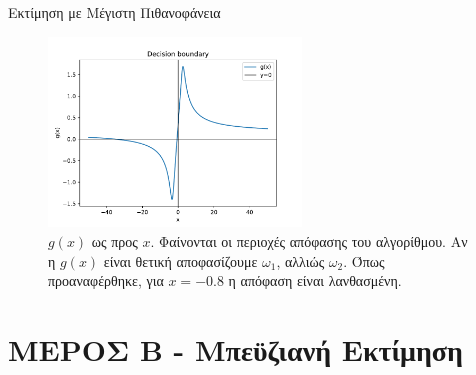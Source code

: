 \documentclass{beamer}
\begin{document}
\begin{frame}{Εκτίμηση με Μέγιστη Πιθανοφάνεια}
    \begin{figure}
        \centering
            \includegraphics[width=0.6\textwidth]{../plots/DB1.pdf}
            \caption{$g(x)$ ως προς $x$. Φαίνονται οι περιοχές απόφασης του αλγορίθμου. Αν 
            η $g(x)$ είναι θετική αποφασίζουμε $\omega_1$, αλλιώς $\omega_2$. Όπως προαναφέρθηκε, 
            για $x=-0.8$ η απόφαση είναι λανθασμένη.}
            \label{fig:DB1}
    \end{figure}

    
\end{frame}



\section{ΜΕΡΟΣ Β - Μπεϋζιανή Εκτίμηση}
\end{document}

